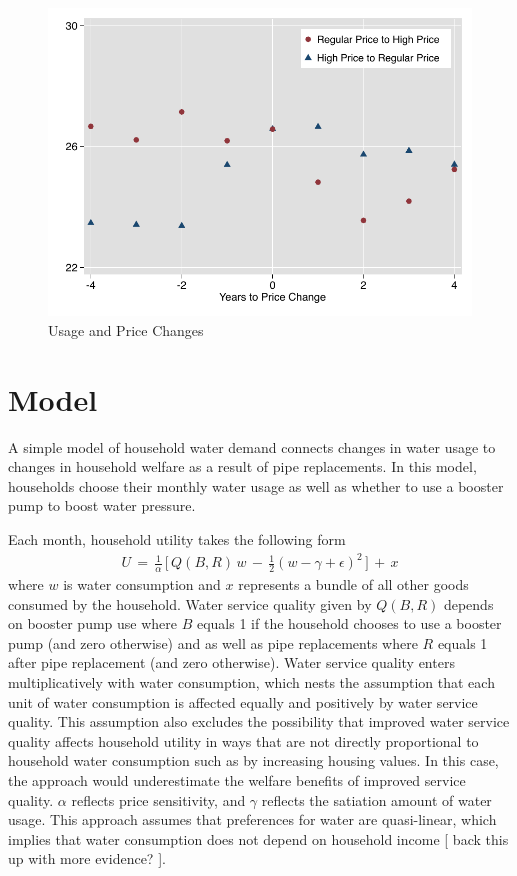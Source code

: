 \documentclass[12pt,table]{article}
\begin{document}
\begin{figure}
\begin{center}
\caption{Usage and Price Changes}\label{figure:usagepricechanges}
\includegraphics[scale=1]{tables/r_to_s_graph.pdf}
\end{center}
\end{figure}

\section{Model}

A simple model of household water demand connects changes in water usage to changes in household welfare as a result of pipe replacements.  In this model, households choose their monthly water usage as well as whether to use a booster pump to boost water pressure.  

Each month, household utility takes the following form
\begin{align}
\label{eq:utility}
U\,=\,\frac{1}{\alpha} \, \Big[ \,  Q(B,R) \,  w  \, -\, \frac{1}{2}(w - \gamma + \epsilon)^2 \, \Big] \, + \, x 
\end{align}
where $w$ is water consumption and $x$ represents a bundle of all other goods consumed by the household.  Water service quality given by $Q(B,R)$ depends on booster pump use where $B$ equals 1 if the household chooses to use a booster pump (and zero otherwise) and as well as pipe replacements where $R$ equals 1 after pipe replacement (and zero otherwise).  Water service quality enters multiplicatively with water consumption, which nests the assumption that each unit of water consumption is affected equally and positively by water service quality.  This assumption also excludes the possibility that improved water service quality affects household utility in ways that are not directly proportional to household water consumption such as by increasing housing values.  In this case, the approach would underestimate the welfare benefits of improved service quality.  $\alpha$ reflects price sensitivity, and $\gamma$ reflects the satiation amount of water usage.  This approach assumes that preferences for water are quasi-linear, which implies that water consumption does not depend on household income [ back this up with more evidence? ].  
\end{document}
